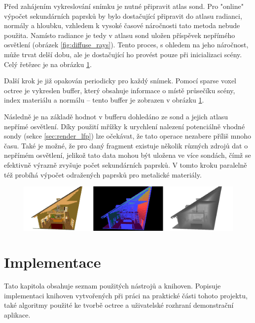 Před zahájením vykreslování snímku je nutné připravit atlas sond. Pro "online" výpočet sekundárních paprsků by bylo dostačující připravit do atlasu radianci, normály a hloubku, vzhledem k vysoké časové náročnosti tato metoda nebude použita. Namísto radiance je tedy v atlasu sond uložen příspěvek nepřímého osvětlení (obrázek \ref{fig:diffuse_rays}). Tento proces, s ohledem na jeho náročnost, může trvat delší dobu, ale je dostačující ho provést pouze při inicializaci scény. Celý řetězec je na obrázku \ref{fig:gbuffer_contents}.

Další krok je již opakován periodicky pro každý snímek. Pomocí sparse voxel octree je vykreslen buffer, který obsahuje informace o místě průsečíku scény, index materiálu a normálu -- tento buffer je zobrazen v obrázku \ref{fig:gbuffer_contents}. 

Následně je na základě hodnot v bufferu dohledáno ze sond a jejich atlasu nepřímé osvětlení. Díky použití mřížky k urychlení nalezení potenciálně vhodné sondy (sekce \ref{sec:render_lfp}) lze očekávat, že tato operace nezabere příliš mnoho času. Také je možné, že pro daný fragment existuje několik různých zdrojů dat o nepřímém osvětlení, jelikož tato data mohou být uložena ve více sondách, čímž se efektivně výrazně zvyšuje počet sekundárních paprsků. V tomto kroku paralelně též probíhá výpočet odražených paprsků pro metalické materiály.


\begin{figure}[H]
	\centering
	\includegraphics[scale=1]{images/gbuffer_render.png}
	\captionsetup{justification=centering}
	\label{fig:gbuffer_contents}
\end{figure}


\chapter{Implementace}
\label{implementace}

Tato kapitola obsahuje seznam použitých nástrojů a knihoven. Popisuje implementaci knihoven vytvořených při práci na praktické části tohoto projektu, také algoritmy použité ke tvorbě octree a uživatelské rozhraní demonstrační aplikace.

